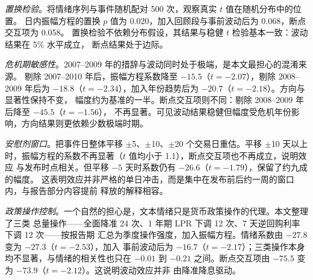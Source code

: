 \emph{置换检验}。将情绪序列与事件随机配对 500 次，观察真实 $t$ 值在随机分布中的位置。
日内振幅方程的置换 $p$ 值为 0.020，加入回顾段与事前波动后为 0.068，断点交互项为 0.058。
置换检验不依赖分布假设，其结果与稳健 $t$ 检验基本一致：波动结果在 5\% 水平成立，
断点结果处于边际。

\emph{危机期敏感性}。2007--2009 年的措辞与波动同时处于极端，是本文最担心的混淆来源。
剔除 2007--2010 年后，振幅方程系数降至 $-15.5$（$t=-2.07$），剔除 2008--2009 年后为
$-18.8$（$t=-2.34$），加入年份趋势后为 $-20.7$（$t=-2.18$）。方向与显著性保持不变，
幅度约为基准的一半。断点交互项则不同：剔除 2008--2009 年后降至 $-45.5$（$t=-1.56$），
不再显著。可见波动结果稳健但幅度受危机年份影响，方向结果则更依赖少数极端时期。

\emph{安慰剂窗口}。把事件日整体平移 $\pm$5、$\pm$10、$\pm$20 个交易日重估。平移 $\pm$10
天以上时，振幅方程的系数不再显著（$t$ 值均小于 1.1），断点交互项也不再成立，说明效应
与发布时点相关。但平移 $-5$ 天时系数仍有 $-26.6$（$t=-1.79$），保留了约九成的幅度。
这表明效应并非严格的单日冲击，而是集中在发布前后约一周的窗口内，与报告部分内容提前
释放的解释相容。

\emph{政策操作控制}。一个自然的担心是，文本情绪只是货币政策操作的代理。本文整理了三类
总量操作——全面降准 24 次、1 年期 LPR 下调 12 次、7 天逆回购利率下调 12 次——按报告期
汇总为季度操作强度，加入振幅方程。情绪系数由 $-27.8$ 变为 $-27.3$（$t=-2.53$），加入
事前波动后为 $-16.7$（$t=-2.17$）；三类操作本身均不显著，与情绪的相关性也只在 $-0.01$
到 $-0.21$ 之间。断点交互项由 $-75.5$ 变为 $-73.9$（$t=-2.12$）。这说明波动效应并非
由降准降息驱动。

